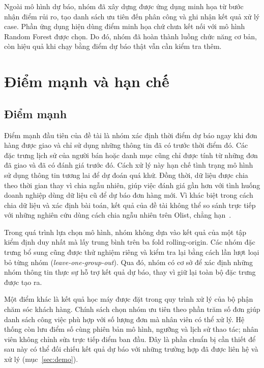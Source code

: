 \documentclass[12pt,a4paper]{report}
\begin{document}
Ngoài mô hình dự báo, nhóm đã xây dựng được ứng dụng minh họa từ bước nhận điểm rủi ro, tạo danh sách ưu tiên đến phân công và ghi nhận kết quả xử lý case. Phần ứng dụng hiện dùng điểm minh họa chứ chưa kết nối với mô hình Random Forest được chọn. Do đó, nhóm đã hoàn thành luồng chức năng cơ bản, còn hiệu quả khi chạy bằng điểm dự báo thật vẫn cần kiểm tra thêm.

\section{Điểm mạnh và hạn chế}\label{sec:disc-sw}

\subsection{Điểm mạnh}

Điểm mạnh đầu tiên của đề tài là nhóm xác định thời điểm dự báo ngay khi đơn hàng được giao và chỉ sử dụng những thông tin đã có trước thời điểm đó. Các đặc trưng lịch sử của người bán hoặc danh mục cũng chỉ được tính từ những đơn đã giao và đã có đánh giá trước đó. Cách xử lý này hạn chế tình trạng mô hình sử dụng thông tin tương lai để dự đoán quá khứ. Đồng thời, dữ liệu được chia theo thời gian thay vì chia ngẫu nhiên, giúp việc đánh giá gần hơn với tình huống doanh nghiệp dùng dữ liệu cũ để dự báo đơn hàng mới. Vì khác biệt trong cách chia dữ liệu và xác định bài toán, kết quả của đề tài không thể so sánh trực tiếp với những nghiên cứu dùng cách chia ngẫu nhiên trên Olist, chẳng hạn~\cite{orman2026}.

Trong quá trình lựa chọn mô hình, nhóm không dựa vào kết quả của một tập kiểm định duy nhất mà lấy trung bình trên ba fold rolling-origin. Các nhóm đặc trưng bổ sung cũng được thử nghiệm riêng và kiểm tra lại bằng cách lần lượt loại bỏ từng nhóm (\emph{leave-one-group-out}). Qua đó, nhóm có cơ sở để xác định những nhóm thông tin thực sự hỗ trợ kết quả dự báo, thay vì giữ lại toàn bộ đặc trưng được tạo ra.

Một điểm khác là kết quả học máy được đặt trong quy trình xử lý của bộ phận chăm sóc khách hàng. Chính sách chọn nhóm ưu tiên theo phần trăm số đơn giúp danh sách công việc phù hợp với số lượng đơn mà nhân viên có thể xử lý. Hệ thống còn lưu điểm số cùng phiên bản mô hình, ngưỡng và lịch sử thao tác; nhân viên không chỉnh sửa trực tiếp điểm ban đầu. Đây là phần chuẩn bị cần thiết để sau này có thể đối chiếu kết quả dự báo với những trường hợp đã được liên hệ và xử lý (mục~\ref{sec:demo}).
\end{document}
